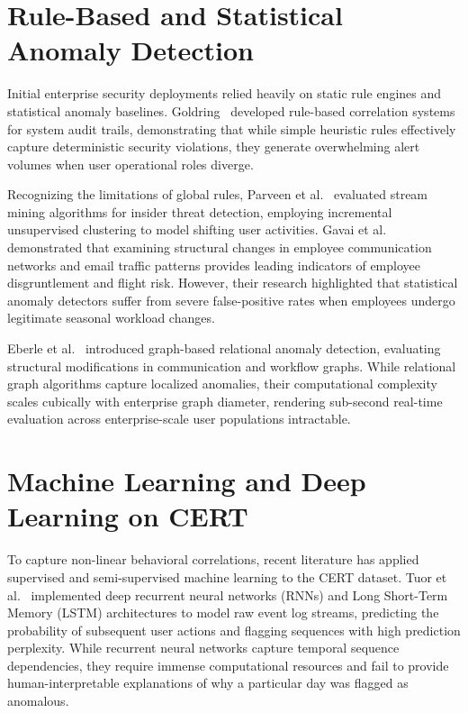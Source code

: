 \documentclass[12pt,a4paper]{report}
\begin{document}
\section{Rule-Based and Statistical Anomaly Detection}
Initial enterprise security deployments relied heavily on static rule engines and statistical anomaly baselines. Goldring~\cite{goldring2004rule} developed rule-based correlation systems for system audit trails, demonstrating that while simple heuristic rules effectively capture deterministic security violations, they generate overwhelming alert volumes when user operational roles diverge.

Recognizing the limitations of global rules, Parveen et al.~\cite{parveen2011unsupervised} evaluated stream mining algorithms for insider threat detection, employing incremental unsupervised clustering to model shifting user activities. Gavai et al.~\cite{gavai2015detecting} demonstrated that examining structural changes in employee communication networks and email traffic patterns provides leading indicators of employee disgruntlement and flight risk. However, their research highlighted that statistical anomaly detectors suffer from severe false-positive rates when employees undergo legitimate seasonal workload changes.

Eberle et al.~\cite{eberle2010insider} introduced graph-based relational anomaly detection, evaluating structural modifications in communication and workflow graphs. While relational graph algorithms capture localized anomalies, their computational complexity scales cubically with enterprise graph diameter, rendering sub-second real-time evaluation across enterprise-scale user populations intractable.

\section{Machine Learning and Deep Learning on CERT}
To capture non-linear behavioral correlations, recent literature has applied supervised and semi-supervised machine learning to the CERT dataset. Tuor et al.~\cite{tuor2017deep} implemented deep recurrent neural networks (RNNs) and Long Short-Term Memory (LSTM) architectures to model raw event log streams, predicting the probability of subsequent user actions and flagging sequences with high prediction perplexity. While recurrent neural networks capture temporal sequence dependencies, they require immense computational resources and fail to provide human-interpretable explanations of why a particular day was flagged as anomalous.
\end{document}
